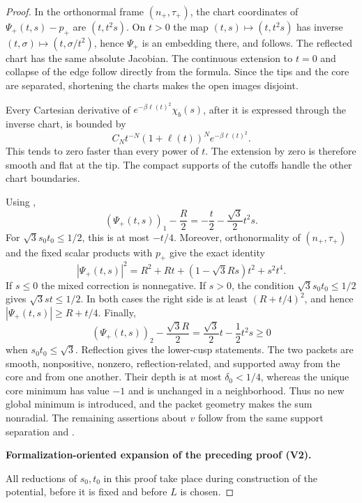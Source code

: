 \documentclass[11pt]{article}
\newcommand{\formalisationparentid}{X}
\newenvironment{formalisationaddition}[1]{\par\medskip\begingroup\color{blue}\def\formalisationparentid{#1}\setcounter{formalizationsublemma}{0}\let\lemma\formalizationsublemma\let\endlemma\endformalizationsublemma
  \def\Eo{\mathcal E_h^\circ}\def\EE{\mathcal E_h}\def\phio{\phi_h^\circ}\def\phih{\phi_h}\def\Ho{H_h^{\rm atom}(v^\circ)}\def\Ha{H_h^{\rm atom}}\def\HL{H_h^{L}}\def\Dh{D_h}\def\Log{\operatorname{Log}}\def\ellh{\ell_h}\def\Gp{G_{p,h}}\def\Ast{A_{*,h}}\def\ahat{\widehat{\mathfrak a}_h}\def\ah{\mathfrak a_h}\def\rh{\widehat\rho_h}\def\deltah{\widehat\delta_h}\def\oldref##1{\textup{(##1)}}\def\interface##1{\par\noindent\textit{Analytical interface used here.} ##1\par}\def\finish{\par\noindent\textit{Conclusion of the formalization-oriented expansion.} }\par\noindent\textbf{Formalization-oriented expansion of the preceding proof (V2).}\par\smallskip
}{\par\endgroup\medskip
}
\begin{document}
\begin{proof}
In the orthonormal frame $(n_+,\tau_+)$, the chart coordinates of
$\Psi_+(t,s)-p_+$ are $(t,t^2s)$.  On $t>0$ the map
$(t,s)\mapsto(t,t^2s)$ has inverse $(t,\sigma)\mapsto(t,\sigma/t^2)$, hence
$\Psi_+$ is an embedding there, and  follows.  The
reflected chart has the same absolute Jacobian.  The continuous extension to
$t=0$ and collapse of the edge follow directly from the formula.  Since the
tips and the core are separated, shortening the charts makes the open images
disjoint.

Every Cartesian derivative of
$e^{-\beta\ell(t)^2}\chi_b(s)$, after it is expressed through the inverse
chart, is bounded by
\[
 C_Nt^{-N}(1+\ell(t))^N e^{-\beta\ell(t)^2}.
\]
This tends to zero faster than every power of $t$.  The extension by zero is
therefore smooth and flat at the tip.  The compact supports of the cutoffs
handle the other chart boundaries.

Using ,
\[
 (\Psi_+(t,s))_1-\frac R2
 =-\frac t2-\frac{\sqrt3}{2}t^2s.
\]
For $\sqrt3s_0t_0\le1/2$, this is at most $-t/4$.  Moreover, orthonormality of $(n_+,\tau_+)$ and the fixed scalar products
with $p_+$ give the exact identity
\[
 |\Psi_+(t,s)|^2
 =R^2+Rt+(1-\sqrt3Rs)t^2+s^2t^4.
\]
If $s\le0$ the mixed correction is nonnegative.  If $s>0$, the condition
$\sqrt3s_0t_0\le1/2$ gives $\sqrt3st\le1/2$.  In both cases the right side is
at least $(R+t/4)^2$, and hence $|\Psi_+(t,s)|\ge R+t/4$.  Finally,
\[
 (\Psi_+(t,s))_2-\frac{\sqrt3R}{2}
 =\frac{\sqrt3}{2}t-\frac12t^2s\ge0
\]
when $s_0t_0\le\sqrt3$.  Reflection gives the lower-cusp statements.  The two packets are smooth,
nonpositive, nonzero, reflection-related, and supported away from the core and
from one another.  Their depth is at most $\delta_0<1/4$, whereas the unique
core minimum has value $-1$ and is unchanged in a neighborhood.  Thus no new
global minimum is introduced, and the packet geometry makes the sum
nonradial.  The remaining assertions about $v$ follow from the same support
separation and .

\begin{formalisationaddition}{L2.9}
All reductions of $s_0,t_0$ in this proof take place during construction of the potential, before it is fixed and before $L$ is chosen.


\end{formalisationaddition}
\end{proof}
\end{document}

